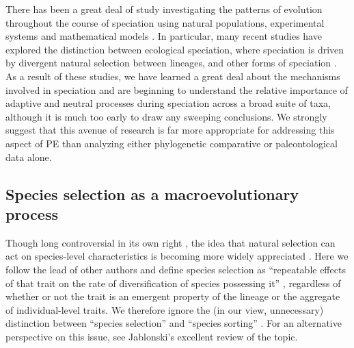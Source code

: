 There has been a great deal of study investigating the patterns of evolution throughout the course of speciation using natural populations, experimental systems and mathematical models \citep[][and references within]{Schluter2000, CoyneOrr, Gavrilets2004, Rundle2005, Doebeli2011, Nosil2012}.  In particular, many recent studies have explored the distinction between ecological speciation, where speciation is driven by divergent natural selection between lineages, and other forms of speciation \citep[e.g., Bateson-Dobzhansky-Muller incompatibilities, speciation driven by sexual selection, etc.; reviewed in ][]{Nosil2012}. As a result of these studies, we have learned a great deal about the mechanisms involved in speciation and are beginning to understand the relative importance of adaptive and neutral processes during speciation across a broad suite of taxa, although it is much too early to draw any sweeping conclusions. We strongly suggest that this avenue of research is far more appropriate for addressing this aspect of PE than analyzing either phylogenetic comparative or paleontological data alone. 

\subsection{Species selection as a macroevolutionary process}

Though long controversial in its own right \citep{FitzJohnthesis}, the idea that natural selection can act on species-level characteristics is becoming more widely appreciated \citep{CoyneOrr, Jablonski2008, RaboskyMcCune2010, FitzJohnthesis}. Here we follow the lead of other authors \citep{Williams1992, CoyneOrr, RaboskyMcCune2010} and define species selection as  ``repeatable effects of that trait on the rate of diversification of species possessing it'' \citep[][p. 444]{CoyneOrr}, regardless of whether or not the trait is an emergent property of the lineage or the aggregate of individual-level traits. We therefore ignore the (in our view, unnecessary) distinction between ``species selection'' and ``species sorting'' \citep[\textit{sensu}][]{GouldVrba1986}. For an alternative perspective on this issue, see Jablonski's excellent review \citeyearpar{Jablonski2008} of the topic.

